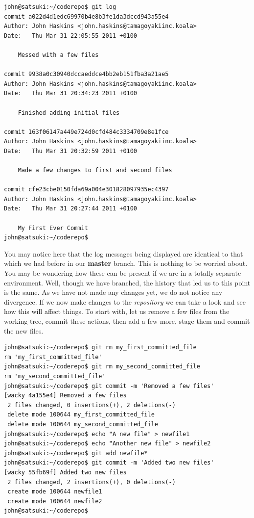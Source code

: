 \begin{Verbatim}
john@satsuki:~/coderepo$ git log
commit a022d4d1edc69970b4e8b3fe1da3dccd943a55e4
Author: John Haskins <john.haskins@tamagoyakiinc.koala>
Date:   Thu Mar 31 22:05:55 2011 +0100

    Messed with a few files

commit 9938a0c30940dccaeddce4bb2eb151fba3a21ae5
Author: John Haskins <john.haskins@tamagoyakiinc.koala>
Date:   Thu Mar 31 20:34:23 2011 +0100

    Finished adding initial files

commit 163f06147a449e724d0cfd484c3334709e8e1fce
Author: John Haskins <john.haskins@tamagoyakiinc.koala>
Date:   Thu Mar 31 20:32:59 2011 +0100

    Made a few changes to first and second files

commit cfe23cbe0150fda69a004e301828097935ec4397
Author: John Haskins <john.haskins@tamagoyakiinc.koala>
Date:   Thu Mar 31 20:27:44 2011 +0100

    My First Ever Commit
john@satsuki:~/coderepo$ 
\end{Verbatim}

You may notice here that the log messages being displayed are identical to that which we had before in our \textbf{master} branch.  This is nothing to be worried about.  You may be wondering how these can be present if we are in a totally separate environment.  Well, though we have branched, the history that led us to this point is the same.  As we have not made any changes yet, we do not notice any divergence.  If we now make changes to the \emph{repository} we can take a look and see how this will affect things.  To start with, let us remove a few files from the working tree, commit these actions, then add a few more, stage them and commit the new files.

\begin{Verbatim}
john@satsuki:~/coderepo$ git rm my_first_committed_file
rm 'my_first_committed_file'
john@satsuki:~/coderepo$ git rm my_second_committed_file
rm 'my_second_committed_file'
john@satsuki:~/coderepo$ git commit -m 'Removed a few files'
[wacky 4a155e4] Removed a few files
 2 files changed, 0 insertions(+), 2 deletions(-)
 delete mode 100644 my_first_committed_file
 delete mode 100644 my_second_committed_file
john@satsuki:~/coderepo$ echo "A new file" > newfile1
john@satsuki:~/coderepo$ echo "Another new file" > newfile2
john@satsuki:~/coderepo$ git add newfile*
john@satsuki:~/coderepo$ git commit -m 'Added two new files'
[wacky 55fb69f] Added two new files
 2 files changed, 2 insertions(+), 0 deletions(-)
 create mode 100644 newfile1
 create mode 100644 newfile2
john@satsuki:~/coderepo$ 
\end{Verbatim}

